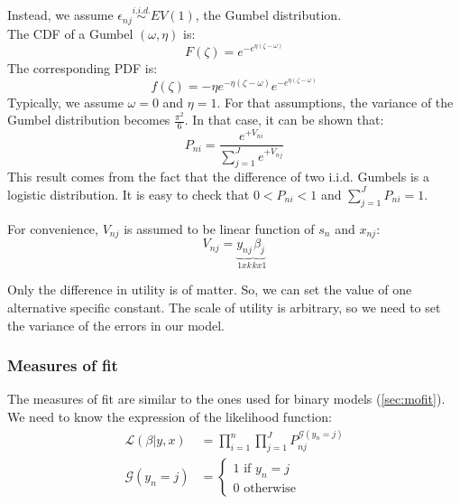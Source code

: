 			Instead, we assume $\epsilon_{nj} \overset{i.i.d.}{\sim} EV(1)$, the Gumbel distribution.\\
			The CDF of a Gumbel $(\omega,\eta)$ is:
			\begin{equation*}
				F(\zeta)=e^{-e^{\eta(\zeta-\omega)}}
			\end{equation*}
			The corresponding PDF is:
			\begin{equation*}
				f(\zeta)=-\eta e^{-\eta(\zeta-\omega)} e^{-e^{\eta(\zeta-\omega)}}
			\end{equation*}
			Typically, we assume $\omega=0$ and $\eta=1$. For that assumptions, the variance of the Gumbel distribution becomes $\frac{\pi^2}{6}$. In that case, it can be shown that:
			\begin{equation*}
				P_{ni}=\frac{e^{+V_{ni}}}{\sum\limits^J_{j=1} e^{+V_{nj}}}
			\end{equation*}
			This result comes from the fact that the difference of two i.i.d. Gumbels is a logistic distribution. It is easy to check that $0<P_{ni}<1$ and $\sum\limits^J_{j=1} P_{ni}=1$.

			For convenience, $V_{nj}$ is assumed to be linear function of $s_n$ and $x_{nj}$:
			\begin{equation*}
				V_{nj}=\underbrace{y_{nj}}_{1xk} \underbrace{\beta_j}_{kx1}
			\end{equation*}
			
			Only the difference in utility is of matter. So, we can set the value of one alternative specific constant. The scale of utility is arbitrary, so we need to set the variance of the errors in our model.
		\subsubsection{Measures of fit}\label{sec:mofitMNL}
			The measures of fit are similar to the ones used for binary models (\ref{sec:mofit}). We need to know the expression of the likelihood function:
			\begin{align*}
				\mathcal{L}(\beta|y,x)&=\prod_{i=1}^{n} \prod_{j=1}^{J} P_{nj}^{\mathcal{G}(y_n=j)}\\
				\mathcal{G}(y_n=j)&=\begin{cases}
					1 \text{ if } y_n=j\\
					0 \text{ otherwise}
				\end{cases}
			\end{align*}
